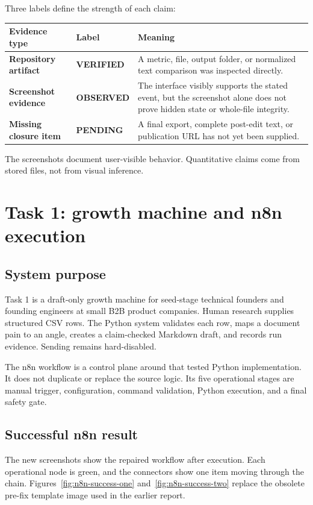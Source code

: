 \documentclass[11pt,a4paper]{article}
\newcommand{\verified}{\textcolor{Good}{\textbf{VERIFIED}}}
\newcommand{\observed}{\textcolor{Warn}{\textbf{OBSERVED}}}
\newcommand{\pending}{\textcolor{Bad}{\textbf{PENDING}}}
\begin{document}
Three labels define the strength of each claim:

\begin{tabularx}{\textwidth}{>{\bfseries}p{} p{} X}
\toprule
Evidence type & Label & Meaning \\
\midrule
Repository artifact & \verified & A metric, file, output folder, or normalized text comparison was inspected directly. \\
Screenshot evidence & \observed & The interface visibly supports the stated event, but the screenshot alone does not prove hidden state or whole-file integrity. \\
Missing closure item & \pending & A final export, complete post-edit text, or publication URL has not yet been supplied. \\
\bottomrule
\end{tabularx}

The screenshots document user-visible behavior. Quantitative claims come from stored files, not from visual inference.

\section{Task 1: growth machine and n8n execution}

\subsection{System purpose}

Task 1 is a draft-only growth machine for seed-stage technical founders and founding engineers at small B2B product companies. Human research supplies structured CSV rows. The Python system validates each row, maps a document pain to an angle, creates a claim-checked Markdown draft, and records run evidence. Sending remains hard-disabled.

The n8n workflow is a control plane around that tested Python implementation. It does not duplicate or replace the source logic. Its five operational stages are manual trigger, configuration, command validation, Python execution, and a final safety gate.

\subsection{Successful n8n result}

The new screenshots show the repaired workflow after execution. Each operational node is green, and the connectors show one item moving through the chain. Figures~\ref{fig:n8n-success-one} and~\ref{fig:n8n-success-two} replace the obsolete pre-fix template image used in the earlier report.
\end{document}
